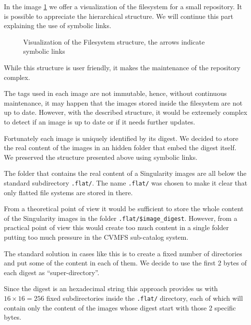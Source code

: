 In the image \ref{fig:simple-fs} we offer a visualization of the filesystem for a small repository. It is possible to appreciate the hierarchical structure. We will continue this part explaining the use of symbolic links.

\begin{figure}
\caption{Visualization of the Filesystem structure, the arrows indicate symbolic links}
\label{fig:simple-fs}
\end{figure}

While this structure is user friendly, it makes the maintenance of the repository complex.

The tags used in each image are not immutable, hence, without continuous maintenance, it may happen that the images stored inside the filesystem are not up to date.
However, with the described structure, it would be extremely complex to detect if an image is up to date or if it needs further updates. 

Fortunately each image is uniquely identified by its digest. 
We decided to store the real content of the images in an hidden folder that embed the digest itself. 
We preserved the structure presented above using symbolic links.

The folder that contains the real content of a Singularity images are all below the standard subdirectory \texttt{.flat/}.
The name \texttt{.flat/} was chosen to make it clear that only flatted file systems are stored in there.

From a theoretical point of view it would be sufficient to store the whole content of the Singularity images in the folder \texttt{.flat/\$image\_digest}. 
However, from a practical point of view this would create too much content in a single folder putting too much pressure in the CVMFS sub-catalog system.

The standard solution in cases like this is to create a fixed number of directories and put some of the content in each of them. 
We decide to use the first 2 bytes of each digest as “super-directory”.

Since the digest is an hexadecimal string this approach provides us with $16 \times 16 = 256$ fixed subdirectories inside the \texttt{.flat/} directory, each of which will contain only the content of the images whose digest start with those 2 specific bytes.

